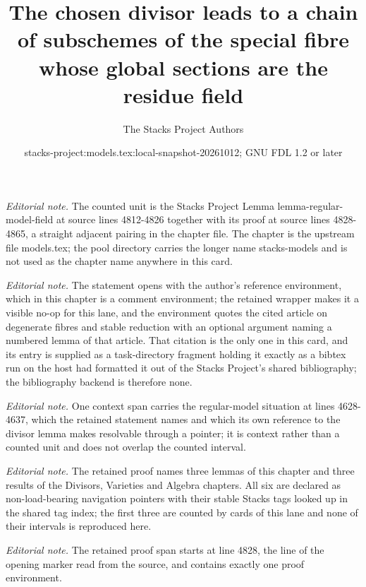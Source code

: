 \documentclass[10pt,a4paper]{amsart}
\title{The chosen divisor leads to a chain of subschemes of the special fibre whose global sections are the residue field}
\author{The Stacks Project Authors}
\date{stacks-project:models.tex:local-snapshot-20261012; GNU FDL 1.2 or later}
\theoremstyle{plain}
\theoremstyle{definition}
\theoremstyle{remark}
\numberwithin{equation}{subsection}
\begin{document}
\maketitle
\noindent\textit{Editorial note.} The counted unit is the Stacks Project Lemma lemma-regular-model-field at source lines 4812-4826 together with its proof at source lines 4828-4865, a straight adjacent pairing in the chapter file. The chapter is the upstream file models.tex; the pool directory carries the longer name stacks-models and is not used as the chapter name anywhere in this card.\par\medskip
\noindent\textit{Editorial note.} The statement opens with the author's reference environment, which in this chapter is a comment environment; the retained wrapper makes it a visible no-op for this lane, and the environment quotes the cited article on degenerate fibres and stable reduction with an optional argument naming a numbered lemma of that article. That citation is the only one in this card, and its entry is supplied as a task-directory fragment holding it exactly as a bibtex run on the host had formatted it out of the Stacks Project's shared bibliography; the bibliography backend is therefore none.\par\medskip
\noindent\textit{Editorial note.} One context span carries the regular-model situation at lines 4628-4637, which the retained statement names and which its own reference to the divisor lemma makes resolvable through a pointer; it is context rather than a counted unit and does not overlap the counted interval.\par\medskip
\noindent\textit{Editorial note.} The retained proof names three lemmas of this chapter and three results of the Divisors, Varieties and Algebra chapters. All six are declared as non-load-bearing navigation pointers with their stable Stacks tags looked up in the shared tag index; the first three are counted by cards of this lane and none of their intervals is reproduced here.\par\medskip
\noindent\textit{Editorial note.} The retained proof span starts at line 4828, the line of the opening marker read from the source, and contains exactly one proof environment.\par\medskip
\end{document}
